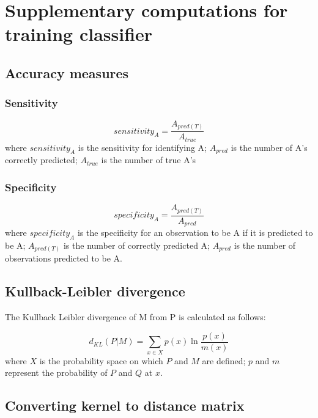 \newpage
\section{Supplementary computations for training classifier}

\subsection{Accuracy measures}

\subsubsection{Sensitivity}
\begin{equation}
    sensitivity_A = \frac{A_{pred(T)}}{A_{true}} 
    \label{eq:sensitivity}
\end{equation}
where $sensitivity_A$ is the sensitivity for identifying A; $A_{pred}$ is the number of A's correctly predicted; $A_{true}$ is the number of true A's

\subsubsection{Specificity}
\begin{equation}
    specificity_A = \frac{A_{pred(T)}}{A_{pred}}
    \label{eq:specificity}
\end{equation}
where $specificity_A$ is the specificity for an observation to be A if it is predicted to be A; $A_{pred(T)}$ is the number of correctly predicted A; $A_{pred}$ is the number of observations predicted to be A.

\subsection{Kullback-Leibler divergence}
The Kullback Leibler divergence of M from P is calculated as follows:

\begin{equation}
    d_{KL}(P|M) = \sum_{x \in X} p(x) \ln{\frac{p(x)}{m(x)}}
    \label{eq:kl}
\end{equation}
where $X$ is the probability space on which $P$ and $M$ are defined; $p$ and $m$ represent the probability of $P$ and $Q$ at $x$.

\subsection{Converting kernel to distance matrix}

